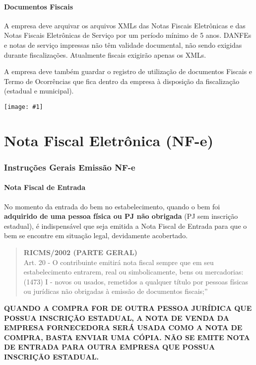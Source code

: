 \documentclass{article}
\newcommand{\imagem}[2]{
  \begin{center}
    \texttt{[image: \#1]}
  \end{center}
}
\newcommand{\parte}[1]{
  \pagebreak
  \partfont{\centering}
  \imagem{logo}{0.4}
  \vspace*{\fill}
    \part{#1}
  \vspace*{\fill}
  \pagebreak
}
\begin{document}
\begin{center}
\begin{longtable}{|P{0.2\linewidth}|P{0.5\linewidth}|P{0.2\linewidth}|}
  \end{longtable}
\end{center}

\subsection{Documentos Fiscais}
\label{arquivo:fiscal}
A empresa deve arquivar os arquivos XMLs das Notas Fiscais Eletrônicas e das Notas Fiscais Eletrônicas de Serviço por um período mínimo de 5 anos. DANFEs e notas de serviço impressas não têm validade documental, não sendo exigidas durante fiscalizações. Atualmente fiscais exigirão apenas os XMLs.

A empresa deve também guardar o registro de utilização de documentos Fiscais e Termo de Ocorrências que fica dentro da empresa à disposição da fiscalização (estadual e municipal).

\parte{Nota Fiscal Eletrônica (NF-e)}
\section{Instruções Gerais Emissão NF-e}
\label{sec:emissao-nfe}
\subsection{Nota Fiscal de Entrada}
\label{emissaonfe:entrada}
No momento da entrada do bem no estabelecimento, quando o bem foi \textbf{adquirido de uma pessoa física ou PJ não obrigada} (PJ sem inscrição estadual), é indispensável que seja emitida a Nota Fiscal de Entrada para que o bem se encontre em situação legal, devidamente acobertado.
\begin{quotation}
  \textbf{RICMS/2002 (PARTE GERAL)} \\
  Art. 20 - O contribuinte emitirá nota fiscal sempre que em seu estabelecimento entrarem, real ou simbolicamente, bens ou mercadorias: \\
  (1473)     I - novos ou usados, remetidos a qualquer título por pessoas físicas ou jurídicas não obrigadas à emissão de documentos fiscais;” \\
\end{quotation}
\begin{tcolorbox}[title=Atenção!]
  \textbf{QUANDO A COMPRA FOR DE OUTRA PESSOA JURÍDICA QUE POSSUA INSCRIÇÃO ESTADUAL, A NOTA DE VENDA DA EMPRESA FORNECEDORA SERÁ USADA COMO A NOTA DE COMPRA, BASTA ENVIAR UMA CÓPIA. NÃO SE EMITE NOTA DE ENTRADA PARA OUTRA EMPRESA QUE POSSUA INSCRIÇÃO ESTADUAL.}
\end{tcolorbox}
\end{document}
